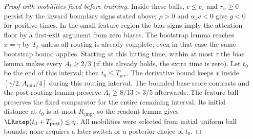 \begin{proof}[Proof with mobilities fixed before training]
Inside these balls, $c\le c_\star$ and $r_u\ge0$ persist by the inward
boundary signs stated above; $\rho>0$ and ${\alpha_z v}<0$ give $g<0$ for positive
times. In the small-feature region the bias signs imply the attention
floor by a first-exit argument from zero biases. The bootstrap lemma
reaches $x=\gamma$ by $T_b$ unless all routing is already complete;
even in that case the same bootstrap bound applies. Starting at this
hitting time, within at most $\tau$ the bias lemma makes every
$A_t\ge2/3$ (if this already holds, the extra time is zero). Let $t_0$
be the end of this interval; then $t_0\le T_{\mathrm{pre}}$.
The derivative bound keeps $x$ inside $[\gamma/2,A_{\min}/4]$ during
this routing interval. The bounded base-score contrasts and the
post-routing lemma preserve $A_t\ge8/13>3/5$ afterwards.
The feature ball preserves the fixed comparator for the entire remaining
interval. Its initial distance at $t_0$ is at most $R_{\mathrm{cmp}}$, so the readout
lemma gives $\LRstep(t_0+T_{\mathrm{post}})\le\eta$.
All mobilities were selected from initial uniform ball bounds; none
requires a later switch or a posterior choice of $t_0$.
\end{proof}

